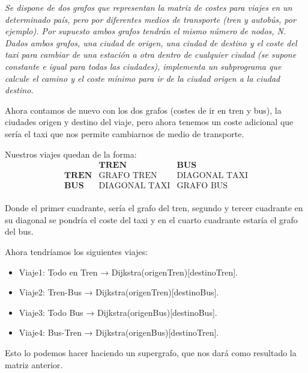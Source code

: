 \textbf{\large{}}\textit{ Se dispone de dos grafos que representan la matriz de costes para viajes en un determinado país, pero por diferentes medios de transporte (tren y autobús, por ejemplo). Por supuesto ambos grafos tendrán el mismo número de nodos, N. Dados ambos grafos, una ciudad de origen, una ciudad de destino y el coste del taxi para cambiar de una estación a otra dentro de cualquier ciudad (se supone constante e igual para todas las ciudades), implementa un subprograma que calcule el camino y el coste mínimo para ir de la ciudad origen a la ciudad destino.}

Ahora contamos de nuevo con los dos grafos (costes de ir en tren y bus), la ciudades origen y destino del viaje, pero ahora tenemos un coste adicional que sería el taxi que nos permite cambiarnos de medio de transporte.

Nuestros viajes quedan de la forma:
\[
\begin{array}{c|c|c}
      & \textbf{TREN} & \textbf{BUS} \\
      \hline
\textbf{TREN} & \text{GRAFO TREN} & \text{DIAGONAL TAXI} \\
      \hline
\textbf{BUS}  & \text{DIAGONAL TAXI} & \text{GRAFO BUS} \\
\end{array}
\]

Donde el primer cuadrante, sería el grafo del tren, segundo y tercer cuadrante en su diagonal se pondría el coste del taxi y en el cuarto cuadrante estaría el grafo del bus.

Ahora tendríamos los siguientes viajes:
\begin{itemize}
  \item Viaje1: Todo en Tren → Dijkstra(origenTren)[destinoTren].
  \item Viaje2: Tren-Bus → Dijkstra(origenTren)[destinoBus].
  \item Viaje3: Todo Bus → Dijkstra(origenBus)[destinoBus].
  \item Viaje4: Bus-Tren → Dijkstra(origenBus)[destinoTren].
\end{itemize}

Esto lo podemos hacer haciendo un supergrafo, que nos dará como resultado la matriz anterior.

